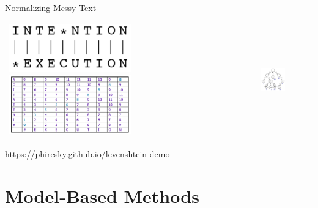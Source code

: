 \documentclass[10pt]{beamer}
\begin{document}
\begin{frame}{Normalizing Messy Text}

\begin{tabular}{p{5cm} p{7cm}}
    \vspace{0pt}
    \includegraphics[width=0.5\textwidth]{figures/string-alignment.png}
	\vspace{0pt}
    \includegraphics[width=0.5\textwidth]{figures/edit-distance-table.png}
    &
    \vspace{0pt}
    \includegraphics[width=0.5\textwidth]{figures/trie-example.png}
\end{tabular}

\begin{center}
\url{https://phiresky.github.io/levenshtein-demo}
\end{center}

\end{frame}

\section{Model-Based Methods}
\end{document}
